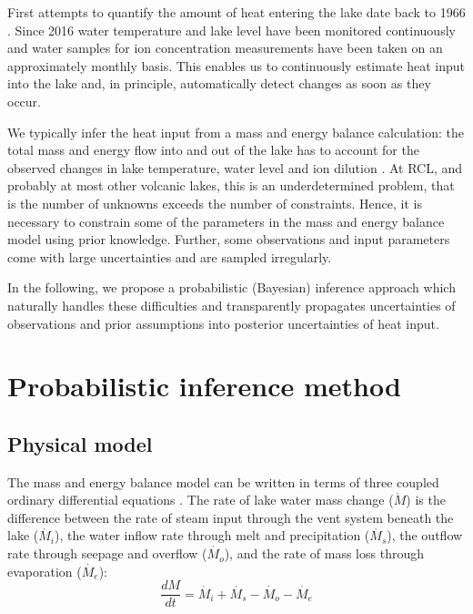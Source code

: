 \documentclass[doublespacing, linenumbers]{bmcart}
\begin{document}
First attempts to quantify the amount of heat entering the lake date back to
1966 \citep{Dibble1966}. Since 2016 water temperature and lake level have been
monitored continuously and water samples for ion concentration measurements have
been taken on an approximately monthly basis. This enables us to continuously
estimate heat input into the lake and, in principle, automatically detect
changes as soon as they occur.

We typically infer the heat input from a mass and energy balance calculation:
the total mass and energy flow into and out of the lake has to account for the
observed changes in lake temperature, water level and ion dilution
\cite{Hurst1981, Hurst1991, Stevenson1992, Fournier2009, Scott1994}. At RCL, and
probably at most other volcanic lakes, this is an underdetermined problem, that
is the number of unknowns exceeds the number of constraints. Hence, it is
necessary to constrain some of the parameters in the mass and energy balance
model using prior knowledge. Further, some observations and input parameters
come with large uncertainties and are sampled irregularly.

In the following, we propose a probabilistic (Bayesian) inference approach which
naturally handles these difficulties and transparently propagates uncertainties of
observations and prior assumptions into posterior uncertainties of heat input.

\section{Probabilistic inference method}\label{Pim}

\subsection{Physical model}\label{phm}

The mass and energy balance model can be written in terms of three coupled
ordinary differential equations \cite{Hurst1991, Stevenson1992}. The rate of
lake water mass change ($\dot{M}$) is the difference between the rate of steam
input through the vent system beneath the lake ($\dot{M_i}$), the water inflow
rate through melt and precipitation ($\dot{M_s}$), the outflow rate through
seepage and overflow ($\dot{M_o}$), and the rate of mass loss through
evaporation ($\dot{M_e}$): 
\begin{equation}\label{ode_M}
	\frac{dM}{dt} = \dot{M_i} + \dot{M_s} - \dot{M_o} - \dot{M_e} 
\end{equation}
\end{document}
